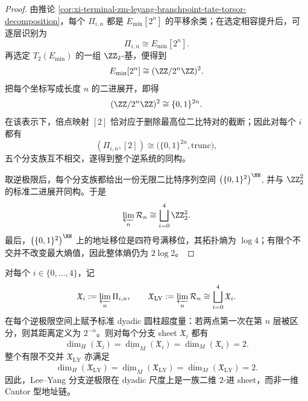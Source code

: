 \documentclass[../../../main.tex]{subfiles}
\begin{document}
\begin{proof}
由推论 \ref{cor:xi-terminal-zm-leyang-branchpoint-tate-torsor-decomposition}，每个 \(\Pi_{i,n}\) 都是 \(E_{\min}[2^n]\) 的平移余类；在选定相容提升后，可逐层识别为
\[
\Pi_{i,n}\cong E_{\min}[2^n].
\]
再选定 \(T_2(E_{\min})\) 的一组 \(\ZZ_2\)-基，便得到
\[
E_{\min}[2^n]\cong (\ZZ/2^n\ZZ)^2.
\]
把每个坐标写成长度 \(n\) 的二进展开，即得
\[
(\ZZ/2^n\ZZ)^2\cong \{0,1\}^{2n}.
\]
在该表示下，倍点映射 \([2]\) 恰对应于删除最高位二比特对的截断；因此对每个 \(i\) 都有
\[
(\Pi_{i,n},[2])\cong \bigl(\{0,1\}^{2n},\mathrm{trunc}\bigr),
\]
五个分支族互不相交，遂得到整个逆系统的同构。

取逆极限后，每个分支族都给出一份无限二比特序列空间
\(
\bigl(\{0,1\}^{2}\bigr)^{\NN}
\),
并与 \(\ZZ_2^2\) 的标准二进展开同构。于是
\[
\varprojlim_n \mathcal R_n
\cong
\bigsqcup_{i=0}^{4}\ZZ_2^2.
\]
最后，\(\bigl(\{0,1\}^{2}\bigr)^{\NN}\) 上的地址移位是四符号满移位，其拓扑熵为 \(\log 4\)；有限个不交并不改变最大熵值，因此整体熵仍为 \(2\log 2\)。
\end{proof}

\begin{corollary}\label{cor:derived-leyang-dyadic-dimension-two}
对每个 \(i\in\{0,\dots,4\}\)，记
\[
\mathfrak X_i:=\varprojlim_n \Pi_{i,n},
\qquad
\mathfrak X_{\mathrm{LY}}:=\varprojlim_n \mathcal R_n\cong \bigsqcup_{i=0}^{4}\mathfrak X_i.
\]
在每个逆极限空间上赋予标准 dyadic 圆柱超度量：若两点第一次在第 \(n\) 层被区分，则其距离定义为 \(2^{-n}\)。则对每个分支 sheet \(\mathfrak X_i\) 都有
\[
\dim_H(\mathfrak X_i)
=
\underline{\dim}_M(\mathfrak X_i)
=
\overline{\dim}_M(\mathfrak X_i)
=
2.
\]
整个有限不交并 \(\mathfrak X_{\mathrm{LY}}\) 亦满足
\[
\dim_H(\mathfrak X_{\mathrm{LY}})
=
\underline{\dim}_M(\mathfrak X_{\mathrm{LY}})
=
\overline{\dim}_M(\mathfrak X_{\mathrm{LY}})
=
2.
\]
因此，Lee--Yang 分支逆极限在 dyadic 尺度上是一族二维 \(2\)-进 sheet，而非一维 Cantor 型地址链。
\end{corollary}
\end{document}
